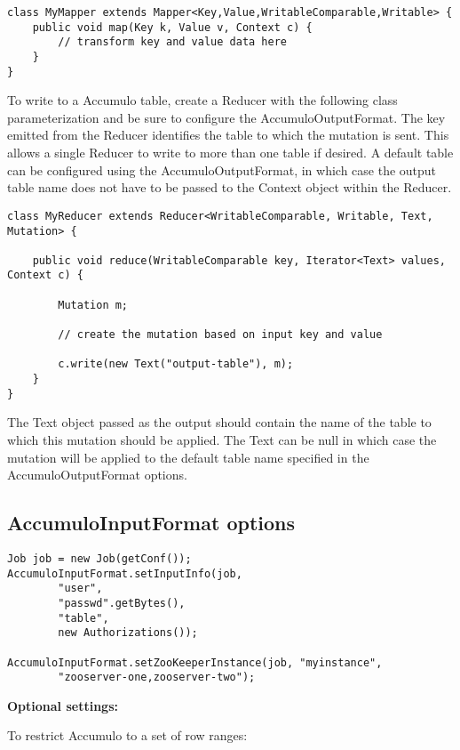 \small
\begin{verbatim}
class MyMapper extends Mapper<Key,Value,WritableComparable,Writable> {
    public void map(Key k, Value v, Context c) {
        // transform key and value data here
    }
}
\end{verbatim}
\normalsize

To write to a Accumulo table, create a Reducer with the following class
parameterization and be sure to configure the AccumuloOutputFormat. The key
emitted from the Reducer identifies the table to which the mutation is sent. This
allows a single Reducer to write to more than one table if desired. A default table
can be configured using the AccumuloOutputFormat, in which case the output table
name does not have to be passed to the Context object within the Reducer.

\small
\begin{verbatim}
class MyReducer extends Reducer<WritableComparable, Writable, Text, Mutation> {

    public void reduce(WritableComparable key, Iterator<Text> values, Context c) {
        
        Mutation m;
        
        // create the mutation based on input key and value
        
        c.write(new Text("output-table"), m);
    }
}
\end{verbatim}
\normalsize

The Text object passed as the output should contain the name of the table to which
this mutation should be applied. The Text can be null in which case the mutation
will be applied to the default table name specified in the AccumuloOutputFormat
options.

\subsection{AccumuloInputFormat options}

\small
\begin{verbatim}
Job job = new Job(getConf());
AccumuloInputFormat.setInputInfo(job,
        "user",
        "passwd".getBytes(),
        "table",
        new Authorizations());

AccumuloInputFormat.setZooKeeperInstance(job, "myinstance",
        "zooserver-one,zooserver-two");
\end{verbatim}

\Large
\textbf{Optional settings:}
\normalsize

To restrict Accumulo to a set of row ranges:

